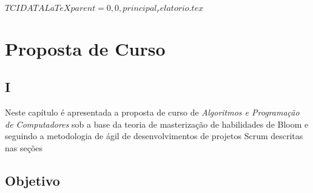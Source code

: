 $TCIDATA{LaTeXparent=0,0,principal_relatorio.tex}$

                      
\chapter{Proposta de Curso }\label{CapPropostaDeCurso}

\section{I}
Neste capítulo é apresentada a proposta de curso de \textit{Algoritmos e Programação de Computadores} sob a base da teoria de masterização de habilidades de Bloom e seguindo a metodologia de ágil de desenvolvimentos de projetos Scrum descritas nas seções



\section{Objetivo}




 

